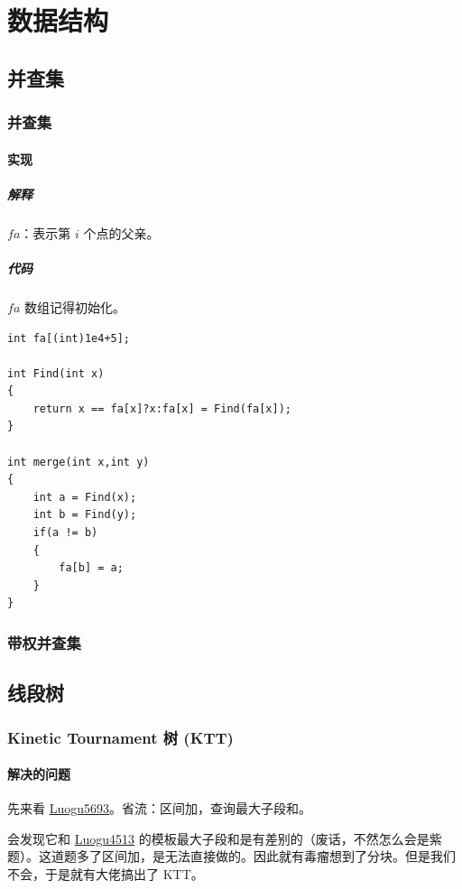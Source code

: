\documentclass[11pt,oneside,a4paper,UTF8]{book}
\begin{document}
	\part{数据结构}
	\chapter{并查集}
	\section{并查集}
	\subsection{实现}
	\subsubsection{解释}
	$fa$：表示第 $i$ 个点的父亲。
	\subsubsection{代码}
	$fa$ 数组记得初始化。
	\begin{lstlisting}
int fa[(int)1e4+5];

int Find(int x)
{
	return x == fa[x]?x:fa[x] = Find(fa[x]);
}

int merge(int x,int y)
{
	int a = Find(x);
	int b = Find(y);
	if(a != b)
	{
		fa[b] = a;
	}
}
	\end{lstlisting}
	\section{带权并查集}
	
	\chapter{线段树}
	\section{Kinetic Tournament 树 (KTT)}
	\subsection{解决的问题}
	先来看 \href{https://www.luogu.com.cn/problem/P5693}{Luogu5693}。省流：区间加，查询最大子段和。\par
	会发现它和 \href{https://www.luogu.com.cn/problem/P4513}{Luogu4513} 的模板最大子段和是有差别的（废话，不然怎么会是紫题）。这道题多了区间加，是无法直接做的。因此就有毒瘤想到了分块。但是我们不会，于是就有大佬搞出了 KTT。\par
\end{document}
